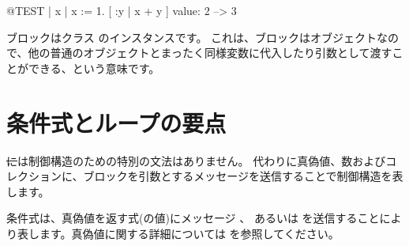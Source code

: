 \documentclass[a4paper,10pt,twoside]{book}
\begin{document}
\begin{code}{@TEST}
| x |
x := 1.
[ :y | x + y ] value: 2 --> 3
\end{code}

ブロックはクラス  のインスタンスです。
これは、ブロックはオブジェクトなので、他の普通のオブジェクトとまったく同様変数に代入したり引数として渡すことができる、という意味です。






\section{条件式とループの要点}

\st には制御構造のための特別の文法はありません。
代わりに真偽値、数およびコレクションに、ブロックを引数とするメッセージを送信することで制御構造を表します。

条件式は、真偽値を返す式(の値)にメッセージ 、 あるいは  を送信することにより表します。真偽値に関する詳細については を参照してください。
\end{document}
